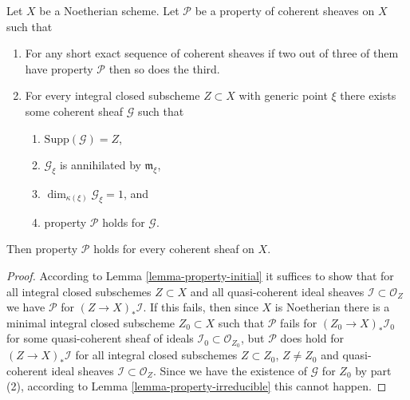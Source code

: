 \begin{lemma}
\label{lemma-property}
Let $X$ be a Noetherian scheme.
Let $\mathcal{P}$ be a property of coherent sheaves on $X$ such that
\begin{enumerate}
\item For any short exact sequence of coherent sheaves if two
out of three of them have property $\mathcal{P}$ then so does the
third.
\item For every integral closed subscheme $Z \subset X$
with generic point $\xi$ there exists
some coherent sheaf $\mathcal{G}$ such that
\begin{enumerate}
\item $\text{Supp}(\mathcal{G}) = Z$,
\item $\mathcal{G}_\xi$ is annihilated by $\mathfrak m_\xi$,
\item $\dim_{\kappa(\xi)} \mathcal{G}_\xi = 1$, and
\item property $\mathcal{P}$ holds for $\mathcal{G}$.
\end{enumerate}
\end{enumerate}
Then property $\mathcal{P}$ holds for every coherent sheaf
on $X$.
\end{lemma}

\begin{proof}
According to Lemma \ref{lemma-property-initial} it suffices to show that
for all integral closed subschemes $Z \subset X$ and all quasi-coherent
ideal sheaves $\mathcal{I} \subset \mathcal{O}_Z$ we have $\mathcal{P}$
for $(Z \to X)_*\mathcal{I}$. If this fails, then since $X$ is Noetherian
there is a minimal integral closed subscheme $Z_0 \subset X$ such that
$\mathcal{P}$ fails for $(Z_0 \to X)_*\mathcal{I}_0$ for some
quasi-coherent sheaf of ideals $\mathcal{I}_0 \subset \mathcal{O}_{Z_0}$,
but $\mathcal{P}$ does hold for $(Z \to X)_*\mathcal{I}$ for all integral
closed subschemes $Z \subset Z_0$, $Z \not = Z_0$ and quasi-coherent
ideal sheaves $\mathcal{I} \subset \mathcal{O}_Z$. Since we have the
existence of $\mathcal{G}$ for $Z_0$ by part (2), according to
Lemma \ref{lemma-property-irreducible} this cannot happen.
\end{proof}

